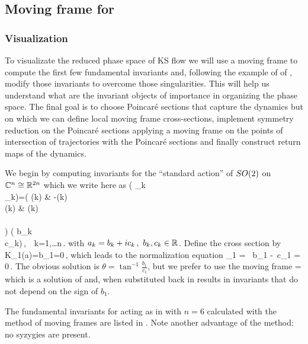 \subsection{Moving frame for \KSe}


\subsubsection{Visualization}

To visualizate the reduced phase space of KS flow we will use a moving frame 
to compute the first few fundamental invariants and, following the example of \CLe of ,
modify those invariants to overcome those singularities. This will help us understand what
are the invariant objects of importance in organizing the phase space. The final goal is to choose
Poincar\'e sections that capture the dynamics but on which we can define local moving frame cross-sections, implement symmetry reduction on the Poincar\'e sections applying a moving frame on
the points of intersection of trajectories with the Poincar\'e sections and finally construct
return maps of the dynamics.

We begin by computing invariants for the ``standard action''  of $SO(2)$ on $\mathbb{C}^{n}\cong\mathbb{R}^{2n}$ which we write here as
\beq
	\left( _k \\ _k\earr \right)=\left(
			    			\cos(k\theta) & -\sin(k\theta)\\
						\sin(k\theta) & \cos(k\theta)\\
			   			\earr\\	
						\right) \left( b_k \\ c_k\earr\right)\,,\ \ k=1,\ldots n\,.
	\label{eq:SO2stand}
\eeq
with $a_k=b_k+i c_k\,,\ b_k,c_k\in\mathbb{R}^{}$.  Define the cross section by
\beq
 	K_1(a)=b_1=0\,,
\eeq
which leads to the normalization equation
\beq
	_1 = \cos\theta\, b_1 -\sin\theta\, c_1 = 0\,.
	\label{eq:SO2norm}
\eeq
The obvious solution is $\theta=\tan^{-1}\frac{b_1}{c_1}$, but we prefer to use the moving frame
\beq
	\theta=
\eeq
which is a solution of  and, when substituted back in  results in invariants that do not depend on the sign of $b_1$.

The fundamental invariants for  acting as in  with
$n=6$ calculated with the method of moving frames are listed in . Note another advantage of the method: no syzygies are present.

